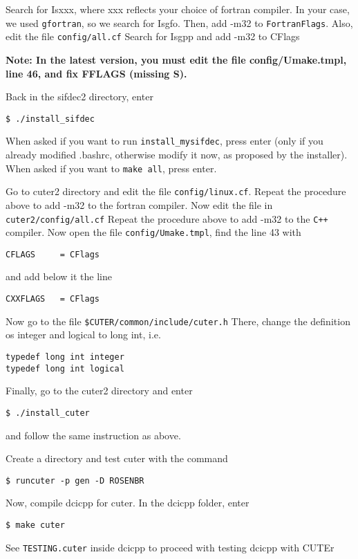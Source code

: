\documentclass[letterpaper,11pt]{article}
\numberwithin{equation}{section}
\begin{document}
Search for Isxxx, where xxx reflects your choice of fortran compiler. In your case, we used \verb+gfortran+, so we search for Isgfo. Then, add -m32 to \verb+FortranFlags+.
Also, edit the file \verb+config/all.cf+
Search for Isgpp and add -m32 to CFlags

{\bf Note: In the latest version, you must edit the file config/Umake.tmpl, line 46, and fix FFLAGS (missing S). }

Back in the sifdec2 directory, enter
\begin{verbatim}
$ ./install_sifdec
\end{verbatim}

When asked if you want to run \verb+install_mysifdec+, press enter (only if you already modified .bashrc, otherwise modify it now, as proposed by the installer).
When asked if you want to \verb+make all+, press enter.

Go to cuter2 directory and edit the file \verb+config/linux.cf+.
Repeat the procedure above to add -m32 to the fortran compiler.
Now edit the file in \verb+cuter2/config/all.cf+
Repeat the procedure above to add -m32 to the \verb-C++- compiler.
Now open the file \verb+config/Umake.tmpl+, find the line 43 with
\begin{verbatim}
CFLAGS     = CFlags
\end{verbatim}
and add below it the line
\begin{verbatim}
CXXFLAGS   = CFlags
\end{verbatim}

Now go to the file \verb+$CUTER/common/include/cuter.h+
There, change the definition os integer and logical to long int, i.e.
\begin{verbatim}
typedef long int integer
typedef long int logical
\end{verbatim}
Finally, go to the cuter2 directory and enter
\begin{verbatim}
$ ./install_cuter
\end{verbatim}
and follow the same instruction as above.

Create a directory and test cuter with the command
\begin{verbatim}
$ runcuter -p gen -D ROSENBR
\end{verbatim}
Now, compile dcicpp for cuter. In the dcicpp folder, enter
\begin{verbatim}
$ make cuter
\end{verbatim}
See \verb+TESTING.cuter+ inside dcicpp to proceed with testing dcicpp with CUTEr
\end{document}
